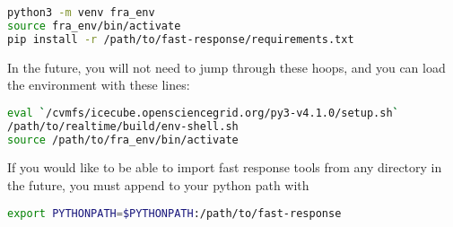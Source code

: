 \begin{lstlisting}[language=bash]
python3 -m venv fra_env
source fra_env/bin/activate
pip install -r /path/to/fast-response/requirements.txt
\end{lstlisting}


In the future, you will not need to jump through these hoops, and you can load the environment with these lines:

\begin{lstlisting}[language=bash]
eval `/cvmfs/icecube.opensciencegrid.org/py3-v4.1.0/setup.sh`
/path/to/realtime/build/env-shell.sh
source /path/to/fra_env/bin/activate
\end{lstlisting}

If you would like to be able to import fast response tools from any directory in the future, you must append to your python path with

\begin{lstlisting}[language=bash]
export PYTHONPATH=$PYTHONPATH:/path/to/fast-response
\end{lstlisting}
